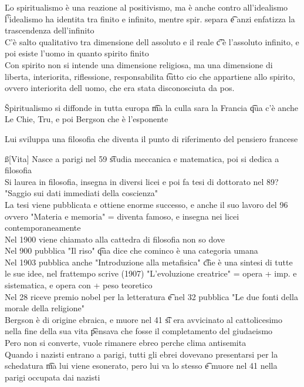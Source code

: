 \documentclass[12pt]{article}
\begin{document}
\v

Lo spiritualismo è una reazione al positivismo, ma è anche contro all'idealismo \t l'idealismo ha identita tra finito e infinito, mentre spir. separa \t e anzi enfatizza la trascendenza dell'infinito \\
C'è salto qualitativo tra dimensione dell assoluto e il reale \t c'è l'assoluto infinito, e poi esiste l'uomo in quanto spirito finito \\
Con spirito non si intende una dimensione religiosa, ma una dimensione di liberta, interiorita, riflessione, responsabilita \t tutto cio che appartiene allo spirito, ovvero interiorita dell uomo, che era stata disconosciuta da pos.

\v

Spiritualismo si diffonde in tutta europa \t ma la culla sara la Francia \t qua c'è anche Le Chie, Tru, e poi Bergson che è l'esponente

\s[Bergson]
Lui sviluppa una filosofia che diventa il punto di riferimento del pensiero francese

\ss[Vita]
Nasce a parigi nel 59 \t studia meccanica e matematica, poi si dedica a filosofia \\
Si laurea in filosofia, insegna in diversi licei e poi fa tesi di dottorato nel 89? "Saggio sui dati immediati della coscienza" \\
La tesi viene pubblicata e ottiene enorme successo, e anche il suo lavoro del 96 ovvero "Materia e memoria" = diventa famoso, e insegna nei licei contemporaneamente \\
Nel 1900 viene chiamato alla cattedra di filosofia non so dove \\
Nel 900 pubblica "Il riso" \t qua dice che cominco è una categoria umana \\
Nel 1903 pubblica anche "Introduzione alla metafisica" \t che è una sintesi di tutte le sue idee, nel frattempo scrive (1907) "L'evoluzione creatrice" = opera + imp. e sistematica, e opera con + peso teoretico \\
Nel 28 riceve premio nobel per la letteratura \t e nel 32 pubblica "Le due fonti della morale della religione" \\
Bergson è di origine ebraica, e muore nel 41 \t si era avvicinato al cattolicesimo nella fine della sua vita \t pensava che fosse il completamento del giudaeismo \\
Pero non si converte, vuole rimanere ebreo perche clima antisemita \\
Quando i nazisti entrano a parigi, tutti gli ebrei dovevano presentarsi per la schedatura \t ma lui viene esonerato, pero lui va lo stesso \t e muore nel 41 nella parigi occupata dai nazisti
\end{document}
